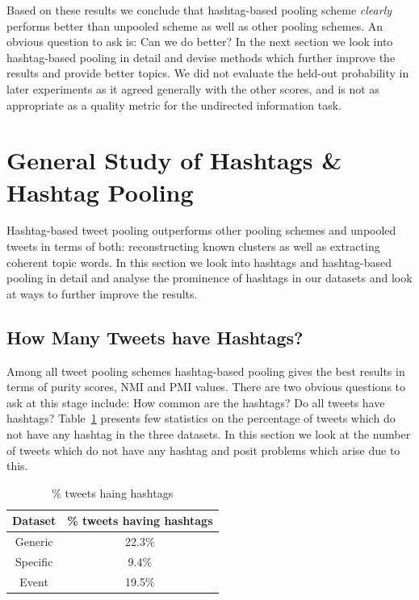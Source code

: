 \documentclass[10pt,a5paper,twoside]{article}
\begin{document}
Based on these results we conclude that hashtag-based pooling scheme
\emph{clearly} performs better than unpooled scheme as well as other
pooling schemes. An obvious question to ask is: Can we do better? In
the next section we look into hashtag-based pooling in detail and
devise methods which further improve the results and provide better
topics.  We did not evaluate the held-out probability in later
experiments as it agreed generally with the other scores,
and is not as appropriate  as a quality metric for the
undirected information task.

\section{General Study of Hashtags \& Hashtag Pooling}

\label{sec:hashtag_pooling}

Hashtag-based tweet pooling outperforms other pooling schemes and
unpooled tweets in terms of both: reconstructing known clusters as
well as extracting coherent topic words. In this section we look into
hashtags and hashtag-based pooling in detail and analyse the
prominence of hashtags in our datasets and look at ways to further
improve the results.

\subsection{How Many Tweets have Hashtags?}

Among all tweet pooling schemes hashtag-based pooling gives the best
results in terms of purity scores, NMI and PMI values. There are two
obvious questions to ask at this stage include: How common are the
hashtags? Do all tweets have hashtags? Table~\ref{tbl-7} presents few
statistics on the percentage of tweets which do not have any hashtag
in the three datasets. In this section we look at the number of tweets which do not have any hashtag and posit problems which arise due to this.

\begin{table}[!h]
\centering
	\begin{tabular}{|c|c|}
	\hline
	Dataset & \% tweets having hashtags\\
	\hline
	Generic & 22.3\%\\
	\hline
	Specific & 9.4\% \\
	\hline
	Event & 19.5\% \\
	\hline
	\end{tabular}
\caption{ \% tweets haing hashtags}\label{tbl-7}
\end{table}
\end{document}
